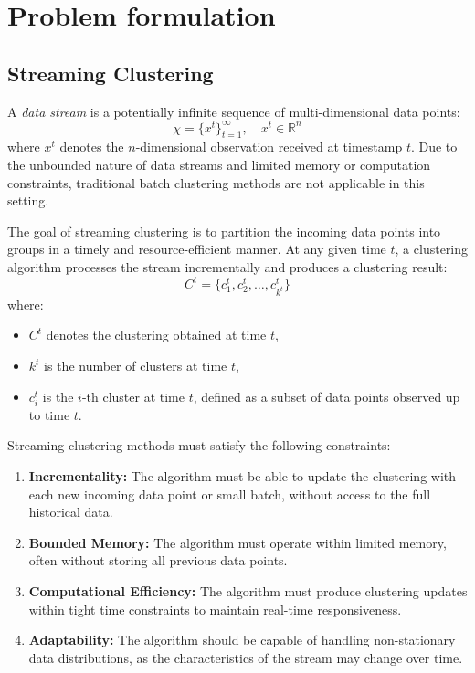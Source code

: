 \chapter{Problem formulation}\label{ch:problem_formulation}

\section{Streaming Clustering}\label{sec:prob_streaming_clustering}
A \textit{data stream} is a potentially infinite sequence of multi-dimensional
data points:
\[
    \chi = \{x^t\}_{t=1}^{\infty}, \quad x^t \in \mathbb{R}^n
\]
where $x^t$ denotes the $n$-dimensional observation received at timestamp $t$.
Due to the unbounded nature of data streams and limited memory or computation
constraints, traditional batch clustering methods are not applicable in this
setting.

The goal of streaming clustering is to partition the incoming data points into
groups in a timely and resource-efficient manner. At any given time $t$, a
clustering algorithm processes the stream incrementally and produces a
clustering result:
\[
    C^t = \{c_1^t, c_2^t, \dots, c_{k^t}^t\}
\]
where:
\begin{itemize}
    \item $C^t$ denotes the clustering obtained at time $t$,
    \item $k^t$ is the number of clusters at time $t$,
    \item $c_i^t$ is the $i$-th cluster at time $t$, defined as a subset of data
          points observed up to time $t$.
\end{itemize}

Streaming clustering methods must satisfy the following constraints:

\begin{enumerate}
    \item \textbf{Incrementality:} The algorithm must be able to update the clustering
          with each new incoming data point or small batch, without access to the full
          historical data.

    \item \textbf{Bounded Memory:} The algorithm must operate within limited memory,
          often without storing all previous data points.

    \item \textbf{Computational Efficiency:} The algorithm must produce clustering
          updates within tight time constraints to maintain real-time responsiveness.

    \item \textbf{Adaptability:} The algorithm should be capable of handling non-stationary
          data distributions, as the characteristics of the stream may change over time.
\end{enumerate}

